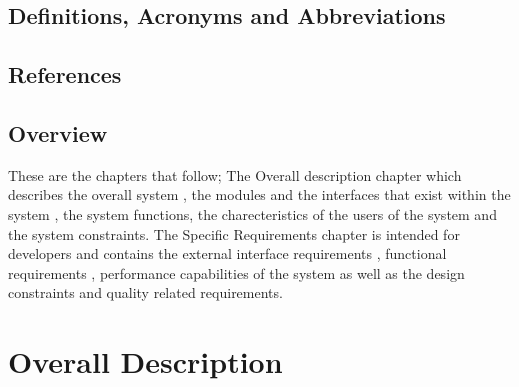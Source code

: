 \documentclass[11pt,a4paper]{article}
\begin{document}
	\subsection{Definitions, Acronyms and Abbreviations}
	

	\subsection{References}


	\subsection{Overview}
		These are the chapters that follow; The Overall description chapter which describes the overall system , the modules and the interfaces that exist within the system , the system functions, the charecteristics of the users of the system and the system constraints. The Specific Requirements chapter is intended for developers and contains the external interface requirements , 			functional requirements , performance capabilities of the system as well as the design constraints and quality related requirements.

\newpage
\section{Overall Description}
\end{document}
